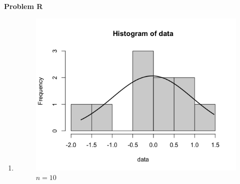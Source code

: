 \documentclass{article}
\begin{document}
\textbf{Problem R}
\begin{enumerate}[label=(\arabic*)]
    \item \qquad
    \begin{figure}[h]
        \centering
        \includegraphics*[scale=0.3]{n=10.png}
        \caption{$n=10$}
    \end{figure}


\end{enumerate}
\end{document}
